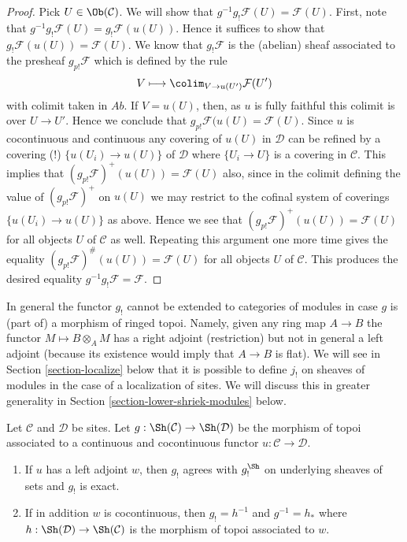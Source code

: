 \begin{proof}
Pick $U \in \Ob(\mathcal{C})$. We will show that
$g^{-1}g_!\mathcal{F}(U) = \mathcal{F}(U)$. First, note that
$g^{-1}g_!\mathcal{F}(U) = g_!\mathcal{F}(u(U))$. Hence it suffices
to show that $g_!\mathcal{F}(u(U)) = \mathcal{F}(U)$.
We know that $g_!\mathcal{F}$ is the (abelian) sheaf associated
to the presheaf $g_{p!}\mathcal{F}$ which is defined by the rule
$$
V \longmapsto \colim_{V \to u(U')} \mathcal{F}(U')
$$
with colimit taken in $\textit{Ab}$. If $V = u(U)$, then, as $u$ is
fully faithful this colimit is over $U \to U'$. Hence we conclude
that $g_{p!}\mathcal{F}(u(U) = \mathcal{F}(U)$.
Since $u$ is cocontinuous and continuous any covering of $u(U)$ in
$\mathcal{D}$ can be refined by a covering (!) $\{u(U_i) \to u(U)\}$
of $\mathcal{D}$ where $\{U_i \to U\}$ is a covering in $\mathcal{C}$.
This implies that $(g_{p!}\mathcal{F})^+(u(U)) = \mathcal{F}(U)$ also,
since in the colimit defining the value of $(g_{p!}\mathcal{F})^+$
on $u(U)$ we may restrict to the cofinal system of coverings
$\{u(U_i) \to u(U)\}$ as above. Hence we see that
$(g_{p!}\mathcal{F})^+(u(U)) = \mathcal{F}(U)$ for all objects $U$
of $\mathcal{C}$ as well. Repeating this argument one more time
gives the equality $(g_{p!}\mathcal{F})^\#(u(U)) = \mathcal{F}(U)$
for all objects $U$ of $\mathcal{C}$. This produces the desired
equality $g^{-1}g_!\mathcal{F} = \mathcal{F}$.
\end{proof}

\begin{remark}
\label{remark-no-extension}
In general the functor $g_!$ cannot be extended to categories of modules
in case $g$ is (part of) a morphism of ringed topoi. Namely, given any
ring map $A \to B$ the functor $M \mapsto B \otimes_A M$ has a right adjoint
(restriction) but not in general a left adjoint (because its existence
would imply that $A \to B$ is flat). We will see in
Section \ref{section-localize}
below that it is possible to define $j_!$ on sheaves of modules
in the case of a localization of sites.
We will discuss this in greater generality in
Section \ref{section-lower-shriek-modules} below.
\end{remark}

\begin{lemma}
\label{lemma-have-left-adjoint}
Let $\mathcal{C}$ and $\mathcal{D}$ be sites. Let
$g : \Sh(\mathcal{C}) \to \Sh(\mathcal{D})$ be the morphism of topoi
associated to a continuous and cocontinuous functor
$u : \mathcal{C} \to \mathcal{D}$.
\begin{enumerate}
\item If $u$ has a left adjoint $w$, then $g_!$ agrees with $g_!^{\Sh}$
on underlying sheaves of sets and $g_!$ is exact.
\item If in addition $w$ is cocontinuous, then $g_! = h^{-1}$ and
$g^{-1} = h_*$ where
$h : \Sh(\mathcal{D}) \to \Sh(\mathcal{C})$ is the morphism of topoi
associated to $w$.
\end{enumerate}
\end{lemma}

